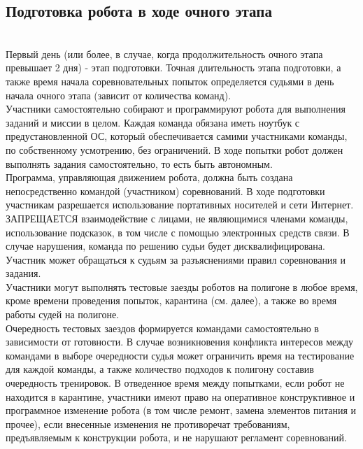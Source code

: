 \documentclass[12pt]{article}
\begin{document}
\subsection{Подготовка робота в ходе очного этапа} \hspace*{1cm}
\\\hspace*{1cm}Первый день (или более, в случае, когда продолжительность очного этапа превышает 2 дня) - этап подготовки. Точная длительность этапа подготовки, а также время начала соревновательных попыток определяется судьями в день начала очного этапа (зависит от количества команд).
\\\hspace*{1cm}Участники самостоятельно собирают и программируют робота для выполнения заданий и миссии в целом. Каждая команда обязана иметь ноутбук с предустановленной ОС, который обеспечивается самими участниками команды, по собственному усмотрению, без ограничений. В ходе попытки робот должен выполнять задания самостоятельно, то есть быть автономным.
\\\hspace*{1cm}Программа, управляющая движением робота, должна быть создана непосредственно командой (участником) соревнований. В ходе подготовки участникам разрешается использование портативных носителей и сети Интернет.
\\\hspace*{1cm}ЗАПРЕЩАЕТСЯ взаимодействие с лицами, не являющимися членами команды, использование подсказок, в том числе с помощью электронных средств связи. В случае нарушения, команда по решению судьи будет дисквалифицирована. Участник может обращаться к судьям за разъяснениями правил соревнования и задания.
\\\hspace*{1cm}Участники могут выполнять тестовые заезды роботов на полигоне в любое время, кроме времени проведения попыток, карантина (см. далее), а также во время работы судей на полигоне.
\\\hspace*{1cm}Очередность тестовых заездов формируется командами самостоятельно в зависимости от готовности. В случае возникновения конфликта интересов между командами в выборе очередности судья может ограничить время на тестирование для каждой команды, а также количество подходов к полигону составив очередность тренировок.
В отведенное время между попытками, если робот не находится в карантине, участники имеют право на оперативное конструктивное и программное изменение робота (в том числе ремонт, замена элементов питания и прочее), если внесенные изменения не противоречат требованиям, предъявляемым к конструкции робота, и не нарушают регламент соревнований.
\end{document}
